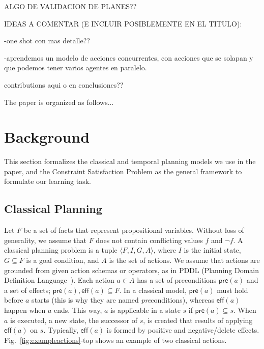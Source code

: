 \documentclass[runningheads]{llncs}
\newcommand{\tup}[1]{{\langle #1 \rangle}}
\newcommand{\pre}{\mathsf{pre}}    %
\newcommand{\eff}{\mathsf{eff}}    %
\begin{document}
ALGO DE VALIDACION DE PLANES??

IDEAS A COMENTAR (E INCLUIR POSIBLEMENTE EN EL TITULO):

-one shot con mas detalle??

-aprendemos un modelo de acciones concurrentes, con acciones que se solapan y que podemos tener varios agentes en paralelo.

contributions aqui o en conclusiones??


The paper is organized as follows...


\section{Background}
\label{sec:background}

This section formalizes the classical and temporal planning models we use in the paper, and the Constraint Satisfaction Problem as the general framework to formulate our learning task.

\subsection{Classical Planning}
\label{sec:classicalplanning}


Let $F$ be a set of facts that represent propositional variables. Without loss of generality, we assume that $F$ does not contain conflicting values $f$ and $\neg f$. A classical planning problem is a tuple $\tup{F,I,G,A}$, where $I$ is the initial state, $G \subseteq F$ is a goal condition, and $A$ is the set of actions. We assume that actions are grounded from given action schemas or operators, as in PDDL (Planning Domain Definition Language~\cite{fox2003pddl2,Ghallab98,ghallab2004automated,hoffmann2005}). Each action $a \in A$ has a set of preconditions $\pre(a)$ and a set of effects; $\pre(a), \eff(a) \subseteq F$. In a classical model, $\pre(a)$ must hold before $a$ starts (this is why they are named \emph{pre}conditions), whereas $\eff(a)$ happen when $a$ ends. This way, $a$ is applicable in a state $s$ if $\pre(a) \subseteq s$. When $a$ is executed, a new state, the successor of $s$, is created that results of applying $\eff(a)$ on $s$. Typically, $\eff(a)$ is formed by positive and negative/delete effects.
Fig.~\ref{fig:exampleactions}-top shows an example of two classical actions.
\end{document}
